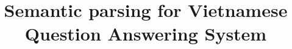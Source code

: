 \documentclass[11pt,twocolumn]{article}
\begin{document}
\title{Semantic parsing for Vietnamese Question Answering System
}
\scriptsize

\maketitle

\begin{abstract}

\end{abstract}











\end{document}
